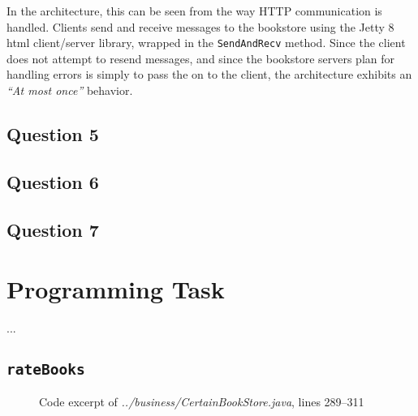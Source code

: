 \documentclass[10pt,a4paper]{article}
\newcommand{\srcroot}{../src/com/acertainbookstore/}
\newcommand{\codeexcerpt}[3]
{
\begin{figure}[H]

\caption{Code excerpt of {\it ../#1}, lines #2--#3}
\end{figure}
}
\begin{document}
In the architecture, this can be seen from the way HTTP communication is handled. Clients send and receive messages to the bookstore using the Jetty 8 html client/server library, wrapped in the {\tt SendAndRecv} method. Since the client does not attempt to resend messages, and since the bookstore servers plan for handling errors is simply to pass the on to the client, the architecture exhibits an {\it ``At most once''} behavior.

\subsection{Question 5}

\subsection{Question 6}

\subsection{Question 7}


\section{Programming Task}
...

\subsection{\tt rateBooks}
\codeexcerpt{business/CertainBookStore.java}{289}{311}
\end{document}
